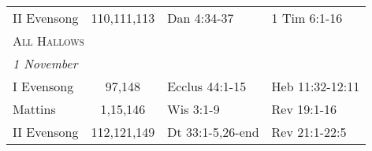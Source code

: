 \begin{longtable}{l c l l}
\hspace{1em} II Evensong&110,111,113&Dan 4:34-37&1 Tim 6:1-16\\
\multicolumn{4}{l}{\textsc{All Hallows}}\\
\multicolumn{4}{l}{\textit{1 November}}\\
\hspace{1em} I Evensong&97,148&Ecclus 44:1-15&Heb 11:32-12:11\\
\hspace{1em} Mattins&1,15,146&Wis 3:1-9&Rev 19:1-16\\
\hspace{1em} II Evensong&112,121,149&Dt 33:1-5,26-end&Rev 21:1-22:5\\
\end{longtable}

\clearpage
